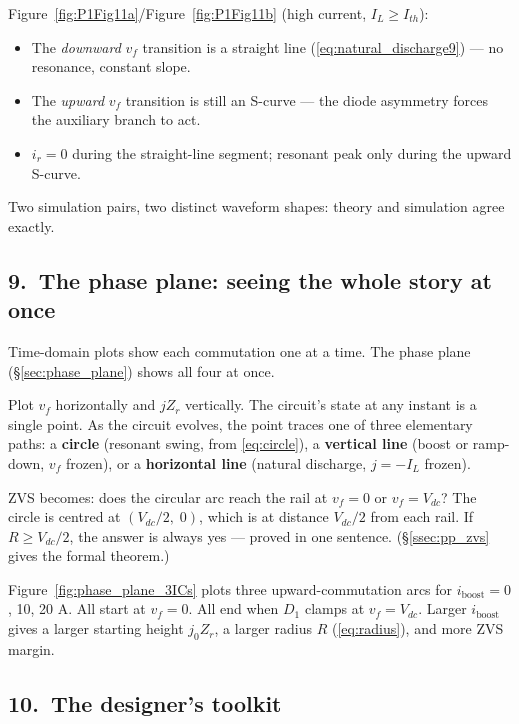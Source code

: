 \documentclass[12pt, a4paper]{article}
\def\,{ }%
\newcommand{\Vdc}{V_{dc}}
\newcommand{\vf}{v_f}
\newcommand{\ir}{i_r}
\newcommand{\IL}{I_L}
\newcommand{\Zr}{Z_r}
\newcommand{\Ith}{I_{th}}
\newcommand{\figref}[1]{Figure~\ref{#1}}
\begin{document}
\figref{fig:P1Fig11a}/\figref{fig:P1Fig11b} (high current, $\IL \geq \Ith$):
\begin{itemize}
    \item The \emph{downward} $\vf$ transition is a straight line
          (\eqref{eq:natural_discharge9}) --- no resonance, constant slope.
    \item The \emph{upward} $\vf$ transition is still an S-curve --- the
          diode asymmetry forces the auxiliary branch to act.
    \item $\ir = 0$ during the straight-line segment; resonant peak only
          during the upward S-curve.
\end{itemize}

Two simulation pairs, two distinct waveform shapes: theory and simulation
agree exactly.

\subsection*{9.\ The phase plane: seeing the whole story at once}

Time-domain plots show each commutation one at a time.
The phase plane (\S\ref{sec:phase_plane}) shows all four at once.

Plot $\vf$ horizontally and $j\Zr$ vertically.
The circuit's state at any instant is a single point.
As the circuit evolves, the point traces one of three elementary paths:
a \textbf{circle} (resonant swing, from \eqref{eq:circle}),
a \textbf{vertical line} (boost or ramp-down, $\vf$ frozen), or
a \textbf{horizontal line} (natural discharge, $j = -\IL$ frozen).

ZVS becomes: does the circular arc reach the rail at $\vf = 0$ or $\vf = \Vdc$?
The circle is centred at $(\Vdc/2,\; 0)$, which is at distance $\Vdc/2$ from
each rail.
If $R \geq \Vdc/2$, the answer is always yes --- proved in one sentence.
(\S\ref{ssec:pp_zvs} gives the formal theorem.)

\figref{fig:phase_plane_3ICs} plots three upward-commutation arcs for
$i_\text{boost} = 0$, 10, 20\,A.
All start at $\vf = 0$.
All end when $D_1$ clamps at $\vf = \Vdc$.
Larger $i_\text{boost}$ gives a larger starting height $j_0\Zr$, a larger
radius $R$ (\eqref{eq:radius}), and more ZVS margin.

\subsection*{10.\ The designer's toolkit}
\end{document}
